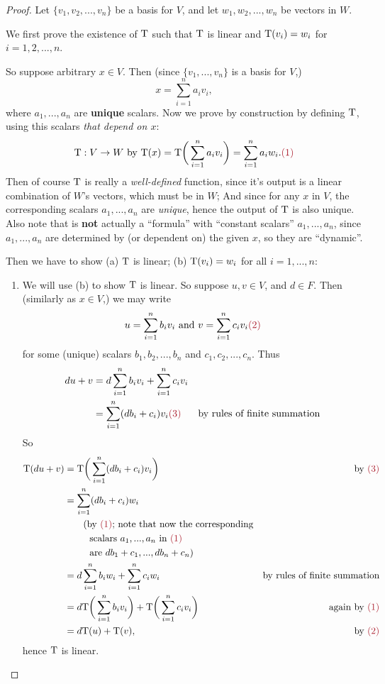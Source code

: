 \begin{proof}
Let \(\{ v_1, v_2, ..., v_n \}\) be a basis for \(V\), and let \(w_1, w_2, ..., w_n\) be vectors in \(W\).

We first prove the existence of \(\mathrm{T}\) such that \(\mathrm{T}\) is linear and \(\mathrm{T}(v_i) = w_i\) for \(i = 1, 2, ..., n\).

So suppose arbitrary \(x \in V\).
Then (since \(\{ v_1, ..., v_n \}\) is a basis for \(V\),)
\[
    x = \sum_{i = 1}^n a_i v_i,
\]
where \(a_1, ..., a_n\) are \textbf{unique} scalars.
Now we prove by construction by defining \(\mathrm{T}\), using this scalars \emph{that depend on \(x\)}:
\[
    \T : V \to W \text{ by } \T(x) = \T\bigg(\sum_{i = 1}^n a_i v_i\bigg) = \sum_{i = 1}^n a_i w_i. \MAROON{(1)}
\]
Then of course \(\mathrm{T}\) is really a \emph{well-defined} function, since
 it's output is a linear combination of \(W\)'s vectors, which must be in \(W\);
 And since for any \(x\) in \(V\), the corresponding scalars \(a_1, ..., a_n\) are \emph{unique}, hence the output of \(\mathrm{T}\) is also unique.
Also note that  is \textbf{not} actually a ``formula'' with ``constant scalars'' \(a_1, ..., a_n\), since \(a_1, ..., a_n\) are determined by (or dependent on) the given \(x\), so they are ``dynamic''.

Then we have to show (a) \(\mathrm{T}\) is linear; (b) \(\mathrm{T}(v_i) = w_i\) for all \(i = 1, ..., n\):
\begin{enumerate}
\item
We will use (b) to show \(\mathrm{T}\) is linear.
So suppose \(u, v \in V\), and \(d \in F\).
Then (similarly as \(x \in V\),) we may write
\[
    u = \sum_{i = 1}^n b_i v_i \text{ and } v = \sum_{i = 1}^n c_i v_i \MAROON{(2)}
\]
for some (unique) scalars \(b_1, b_2, ..., b_n\) and \(c_1, c_2, ..., c_n\).
Thus
\begin{align*}
    d u + v & = d \sum_{i = 1}^n b_i v_i + \sum_{i = 1}^n c_i v_i \\
            & = \sum_{i = 1}^n (db_i + c_i) v_i \MAROON{(3)} & \text{by rules of finite summation}
\end{align*}
So
\begin{align*}
    \T(du + v) & = \T\bigg( \sum_{i = 1}^n (db_i + c_i) v_i \bigg) & \text{by \MAROON{(3)}} \\
               & = \sum_{i = 1}^n (db_i + c_i) w_i \\
               & \text{\ \ \ \ \ \ (by \MAROON{(1)}; note that now the corresponding} \\
               & \text{\ \ \ \ \ \ \ \ scalars \(a_1, ..., a_n\) in \MAROON{(1)}} \\
               & \text{\ \ \ \ \ \ \ \ are \(d b_1 + c_1, ..., d b_n + c_n\))} \\
               & = d \sum_{i = 1}^n b_i w_i + \sum_{i = 1}^n c_i w_i & \text{by rules of finite summation} \\
               & = d \T\bigg( \sum_{i = 1}^n b_i v_i \bigg) + \T\bigg( \sum_{i = 1}^n c_i v_i \bigg) & \text{again by \MAROON{(1)}} \\
               & = d \T(u) + \T(v), & \text{by \MAROON{(2)}}
\end{align*}
hence \(\mathrm{T}\) is linear.


\end{enumerate}
\end{proof}
